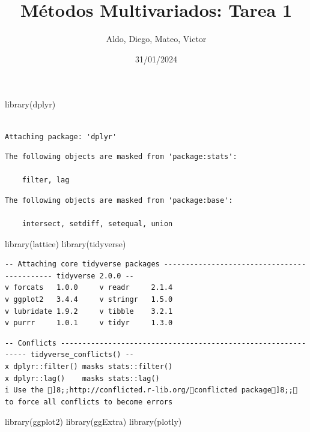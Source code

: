 \documentclass[
]{article}
\title{Métodos Multivariados: Tarea 1}
\author{Aldo, Diego, Mateo, Victor}
\date{31/01/2024}
\newenvironment{Shaded}{\begin{snugshade}}{\end{snugshade}}
\newcommand{\FunctionTok}[1]{\textcolor[rgb]{0.00,0.00,0.00}{#1}}
\newcommand{\NormalTok}[1]{#1}
\begin{document}
\maketitle

\begin{Shaded}
\begin{Highlighting}[]
\FunctionTok{library}\NormalTok{(dplyr)}
\end{Highlighting}
\end{Shaded}

\begin{verbatim}

Attaching package: 'dplyr'
\end{verbatim}

\begin{verbatim}
The following objects are masked from 'package:stats':

    filter, lag
\end{verbatim}

\begin{verbatim}
The following objects are masked from 'package:base':

    intersect, setdiff, setequal, union
\end{verbatim}

\begin{Shaded}
\begin{Highlighting}[]
\FunctionTok{library}\NormalTok{(lattice)}
\FunctionTok{library}\NormalTok{(tidyverse)}
\end{Highlighting}
\end{Shaded}

\begin{verbatim}
-- Attaching core tidyverse packages -------------------------------------------- tidyverse 2.0.0 --
v forcats   1.0.0     v readr     2.1.4
v ggplot2   3.4.4     v stringr   1.5.0
v lubridate 1.9.2     v tibble    3.2.1
v purrr     1.0.1     v tidyr     1.3.0
\end{verbatim}

\begin{verbatim}
-- Conflicts -------------------------------------------------------------- tidyverse_conflicts() --
x dplyr::filter() masks stats::filter()
x dplyr::lag()    masks stats::lag()
i Use the ]8;;http://conflicted.r-lib.org/conflicted package]8;; to force all conflicts to become errors
\end{verbatim}

\begin{Shaded}
\begin{Highlighting}[]
\FunctionTok{library}\NormalTok{(ggplot2)}
\FunctionTok{library}\NormalTok{(ggExtra)}
\FunctionTok{library}\NormalTok{(plotly)}
\end{Highlighting}
\end{Shaded}
\end{document}
